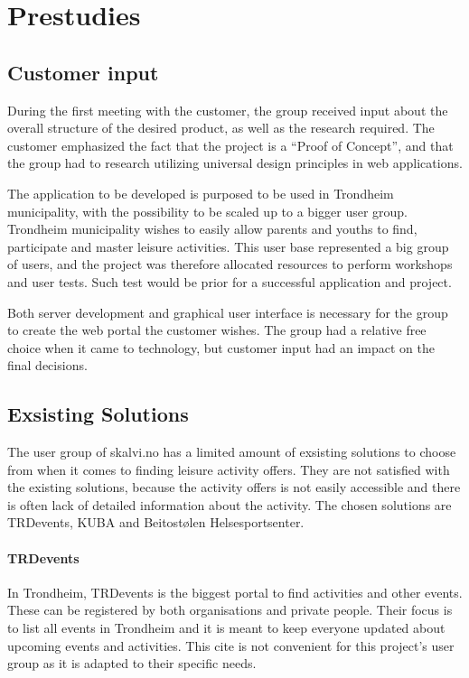 
\chapter{Prestudies}


\section{Customer input}
During the first meeting with the customer, the group received input about the overall structure of the desired product, as well as the research required. The customer emphasized the fact that the project is a “Proof of Concept”, and that the group had to research utilizing universal design principles in web applications.

The application to be developed is purposed to be used in Trondheim municipality, with the possibility to be scaled up to a bigger user group. Trondheim municipality wishes to easily allow parents and youths to find, participate and master leisure activities. This user base represented a big group of users, and the project was therefore allocated resources to perform workshops and user tests. Such test would be prior for a successful application and project.

Both server development and graphical user interface is necessary for the group to create the web portal the customer wishes. The group had a relative free choice when it came to technology, but customer input had an impact on the final decisions.

\section{Exsisting Solutions}
\label{alternativeSolutions}
The user group of skalvi.no has a limited amount of exsisting solutions to choose from when it comes to finding leisure activity offers. They are not satisfied with the existing solutions, because the activity offers is not easily accessible and there is often lack of detailed information about the activity.  
The chosen solutions are TRDevents, KUBA and Beitostølen Helsesportsenter. 

\subsubsection{TRDevents}
In Trondheim, TRDevents \cite{TRDevents} is the biggest portal to find activities and other events. These can be registered by both organisations and private people. Their focus is to list all events in Trondheim and it is meant to keep everyone updated about upcoming events and activities. This cite is not convenient for this project's user group as it is adapted to their specific needs.

